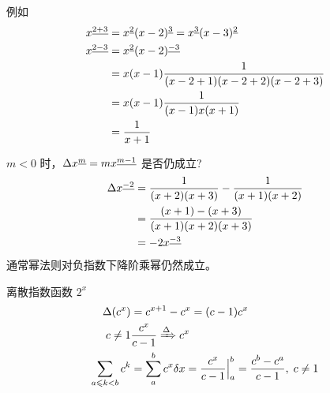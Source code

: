 例如
\begin{align*}
    x^{\underline{2+3}} 
    &= x^{\underline{2}}(x-2)^{\underline{3}}
    =x^{\underline{3}}(x-3)^{\underline{2}} \\
    x^{\underline{2-3}}
    &= x^{\underline{2}}(x-2)^{\underline{-3}}\\
    &= x(x-1)\frac{1}{(x-2+1)(x-2+2)(x-2+3)}\\
    &= x(x-1)\frac{1}{(x-1)x(x+1)}\\
    &= \frac{1}{x+1}
\end{align*}

$ m<0 $ 时，$ \Delta x^{\underline{m}} = m x^{\underline{m-1}} $ 是否仍成立?
\begin{align*}
    \Delta x^{\underline{-2}} 
    &= \frac{1}{(x+2)(x+3)} - \frac{1}{(x+1)(x+2)} \\
    &= \frac{(x+1)-(x+3)}{(x+1)(x+2)(x+3)} \\
    &= -2x^{\underline{-3}}
\end{align*}
通常幂法则对负指数下降阶乘幂仍然成立。

离散指数函数 $ 2^x $ 
\begin{align*}
    \Delta (c^x) &= c^{x+1}-c^x = (c-1)c^x \\
    c \neq 1 & \frac{c^x}{c-1}\xRightarrow{\Delta}c^x\\
    \sum_{a\leqslant k <b}c^k &= \sum_{a}^{b}c^x \delta x = \frac{c^x}{c-1}\Big|_a^b =\frac{c^b-c^a}{c-1}, \; c\neq 1
\end{align*}

